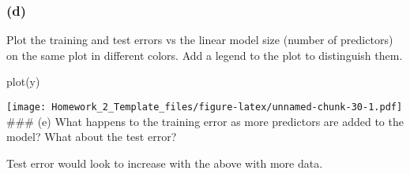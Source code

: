 \documentclass[
]{article}
\newenvironment{Shaded}{\begin{snugshade}}{\end{snugshade}}
\newcommand{\FunctionTok}[1]{\textcolor[rgb]{0.00,0.00,0.00}{#1}}
\newcommand{\NormalTok}[1]{#1}
\begin{document}
\hypertarget{d-3}{%
\subsubsection{(d)}\label{d-3}}

Plot the training and test errors vs the linear model size (number of
predictors) on the same plot in different colors. Add a legend to the
plot to distinguish them.

\begin{Shaded}
\begin{Highlighting}[]
\FunctionTok{plot}\NormalTok{(y)}
\end{Highlighting}
\end{Shaded}

\texttt{[image: Homework\_2\_Template\_files/figure-latex/unnamed-chunk-30-1.pdf]}
\#\#\# (e) What happens to the training error as more predictors are
added to the model? What about the test error?

Test error would look to increase with the above with more data.
\end{document}

